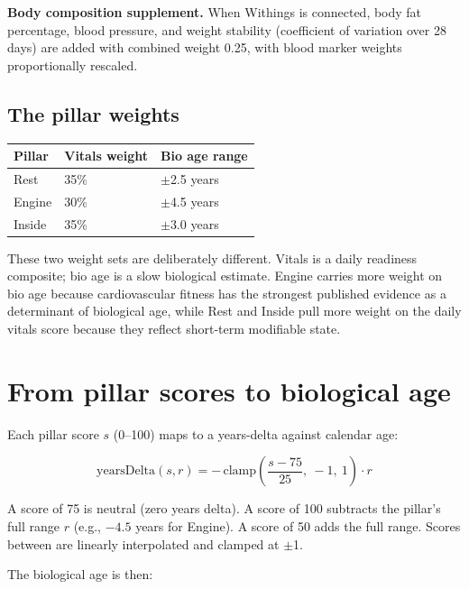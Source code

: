 \documentclass[11pt, a4paper]{article}
\begin{document}
\textbf{Body composition supplement.} When Withings is connected, body fat percentage, blood pressure, and weight stability (coefficient of variation over 28 days) are added with combined weight 0.25, with blood marker weights proportionally rescaled.

\subsection{The pillar weights}

\vspace{0.3em}
\noindent
\begin{tabularx}{\linewidth}{@{} L{4cm} L{4cm} X @{}}
\toprule
\textbf{Pillar} & \textbf{Vitals weight} & \textbf{Bio age range} \\
\midrule
Rest & 35\% & $\pm$2.5 years \\
Engine & 30\% & $\pm$4.5 years \\
Inside & 35\% & $\pm$3.0 years \\
\bottomrule
\end{tabularx}
\vspace{0.5em}

These two weight sets are deliberately different. Vitals is a daily readiness composite; bio age is a slow biological estimate. Engine carries more weight on bio age because cardiovascular fitness has the strongest published evidence as a determinant of biological age, while Rest and Inside pull more weight on the daily vitals score because they reflect short-term modifiable state.

\section{From pillar scores to biological age}

Each pillar score $s$ (0--100) maps to a years-delta against calendar age:

\begin{equation}
\text{yearsDelta}(s, r) = -\,\text{clamp}\!\left(\frac{s - 75}{25},\ -1,\ 1\right) \cdot r
\end{equation}

A score of 75 is neutral (zero years delta). A score of 100 subtracts the pillar's full range $r$ (e.g., $-4.5$ years for Engine). A score of 50 adds the full range. Scores between are linearly interpolated and clamped at $\pm$1.

The biological age is then:
\end{document}
